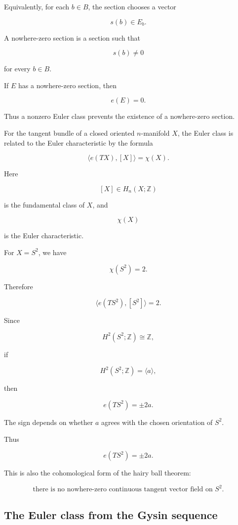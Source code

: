 \documentclass[12pt,a4paper]{article}
\newcommand{\Z}{\mathbb{Z}}
\theoremstyle{notespace}
\begin{document}
	Equivalently, for each \(b\in B\), the section chooses a vector
	
	\[
	s(b)\in E_b.
	\]
	
	A nowhere-zero section is a section such that
	
	\[
	s(b)\neq 0
	\]
	
	for every \(b\in B\).
	
	If \(E\) has a nowhere-zero section, then
	
	\[
	e(E)=0.
	\]
	
	Thus a nonzero Euler class prevents the existence of a nowhere-zero section.
	
	For the tangent bundle of a closed oriented \(n\)-manifold \(X\), the Euler class is related to the Euler characteristic by the formula
	
	\[
	\langle e(TX),[X]\rangle=\chi(X).
	\]
	
	Here
	
	\[
	[X]\in H_n(X;\Z)
	\]
	
	is the fundamental class of \(X\), and
	
	\[
	\chi(X)
	\]
	
	is the Euler characteristic.
	
	For \(X=S^{2}\), we have
	
	\[
	\chi(S^{2})=2.
	\]
	
	Therefore
	
	\[
	\langle e(TS^{2}),[S^{2}]\rangle=2.
	\]
	
	Since
	
	\[
	H^{2}(S^{2};\Z)\cong \Z,
	\]
	
	if
	
	\[
	H^{2}(S^{2};\Z)=\langle a\rangle,
	\]
	
	then
	
	\[
	e(TS^{2})=\pm 2a.
	\]
	
	The sign depends on whether \(a\) agrees with the chosen orientation of \(S^{2}\).
	
	Thus
	
	\[
	\boxed{
		e(TS^{2})=\pm 2a.
	}
	\]
	
	This is also the cohomological form of the hairy ball theorem:
	
	\[
	\boxed{
		\text{there is no nowhere-zero continuous tangent vector field on }S^{2}.
	}
	\]
	
	\subsection{The Euler class from the Gysin sequence}
	
\end{document}
